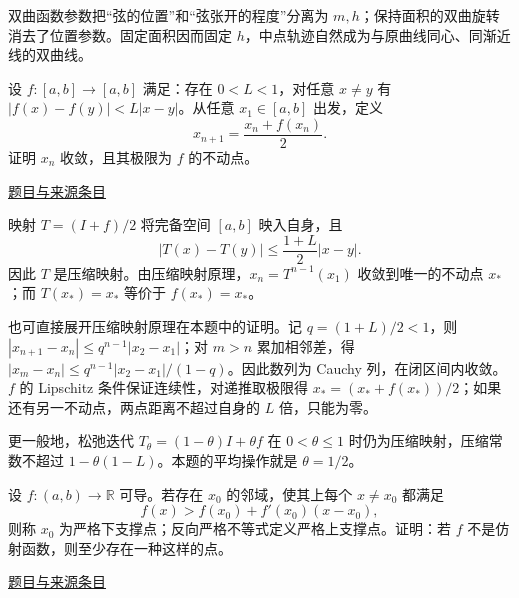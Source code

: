 \documentclass[UTF8,12pt,a4paper,fontset=fandol]{ctexart}
\begin{document}
\begin{remark}[方法与条件]双曲函数参数把“弦的位置”和“弦张开的程度”分离为 $m,h$；保持面积的双曲旋转消去了位置参数。固定面积因而固定 $h$，中点轨迹自然成为与原曲线同心、同渐近线的双曲线。\end{remark}

\begin{example}[来源序号2]\label{ex:fin04-all:2}\label{pr:fin04-all:2}

设 $f:[a,b]\to[a,b]$ 满足：存在 $0<L<1$，对任意 $x\ne y$ 有
$|f(x)-f(y)|<L|x-y|$。从任意 $x_1\in[a,b]$ 出发，定义
\[
x_{n+1}=\frac{x_n+f(x_n)}2.
\]
证明 $x_n$ 收敛，且其极限为 $f$ 的不动点。

\par\href{https://github.com/lzxcr/cmc-mathematics/blob/64916fa1fdbc3e444a652eca204d5669058ee321/src/problems/finals/04/02.md}{题目与来源条目}

\end{example}

\begin{solve}\label{ans:fin04-all:2}

映射 $T=(I+f)/2$ 将完备空间 $[a,b]$ 映入自身，且
\[
|T(x)-T(y)|\le\frac{1+L}{2}|x-y|.
\]
因此 $T$ 是压缩映射。由压缩映射原理，$x_n=T^{n-1}(x_1)$ 收敛到唯一的不动点 $x_*$；而 $T(x_*)=x_*$ 等价于 $f(x_*)=x_*$。

也可直接展开压缩映射原理在本题中的证明。记 $q=(1+L)/2<1$，则 $|x_{n+1}-x_n|\le q^{n-1}|x_2-x_1|$；对 $m>n$ 累加相邻差，得 $|x_m-x_n|\le q^{n-1}|x_2-x_1|/(1-q)$。因此数列为 Cauchy 列，在闭区间内收敛。$f$ 的 Lipschitz 条件保证连续性，对递推取极限得 $x_*=(x_*+f(x_*))/2$；如果还有另一不动点，两点距离不超过自身的 $L$ 倍，只能为零。

\end{solve}

\begin{remark}[方法与条件]更一般地，松弛迭代 $T_\theta=(1-\theta)I+\theta f$ 在 $0<\theta\le1$ 时仍为压缩映射，压缩常数不超过 $1-\theta(1-L)$。本题的平均操作就是 $\theta=1/2$。\end{remark}

\begin{example}[来源序号4]\label{ex:fin04-all:4}\label{pr:fin04-all:4}

设 $f:(a,b)\to\mathbb R$ 可导。若存在 $x_0$ 的邻域，使其上每个 $x\ne x_0$ 都满足
\[
f(x)>f(x_0)+f'(x_0)(x-x_0),
\]
则称 $x_0$ 为严格下支撑点；反向严格不等式定义严格上支撑点。证明：若 $f$ 不是仿射函数，则至少存在一种这样的点。

\par\href{https://github.com/lzxcr/cmc-mathematics/blob/64916fa1fdbc3e444a652eca204d5669058ee321/src/problems/finals/04/04.md}{题目与来源条目}

\end{example}
\end{document}
